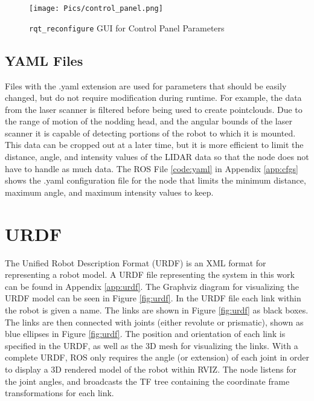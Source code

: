 \begin{figure}[h]
    \centering
    \texttt{[image: Pics/control\_panel.png]}
    \caption{\texttt{rqt\_reconfigure} GUI for Control Panel Parameters}
    \label{fig:cpgui}
\end{figure}

\subsection{YAML Files}
Files with the .yaml extension are used for parameters that should be easily changed, but do not require modification during runtime. For example, the data from the laser scanner is filtered before being used to create pointclouds. Due to the range of motion of the nodding head, and the angular bounds of the laser scanner it is capable of detecting portions of the robot to which it is mounted. This data can be cropped out at a later time, but it is more efficient to limit the distance, angle, and intensity values of the LIDAR data so that the  node does not have to handle as much data. The ROS File \ref{code:yaml} in Appendix \ref{app:cfgs} shows the .yaml configuration file for the  node that limits the minimum distance, maximum angle, and maximum intensity values to keep.\\

\section{URDF}
The Unified Robot Description Format (URDF) is an XML format for representing a robot model. A URDF file representing the system in this work can be found in Appendix \ref{app:urdf}. The Graphviz diagram for visualizing the URDF model can be seen in Figure \ref{fig:urdf}. In the URDF file each link within the robot is given a name. The links are shown in Figure \ref{fig:urdf} as black boxes. The links are then connected with joints (either revolute or prismatic), shown as blue ellipses in Figure \ref{fig:urdf}. The position and orientation of each link is specified in the URDF, as well as the 3D mesh for visualizing the links. With a complete URDF, ROS only requires the angle (or extension) of each joint in order to display a 3D rendered model of the robot within RVIZ. The  node listens for the joint angles, and broadcasts the TF tree containing the coordinate frame transformations for each link.\\

